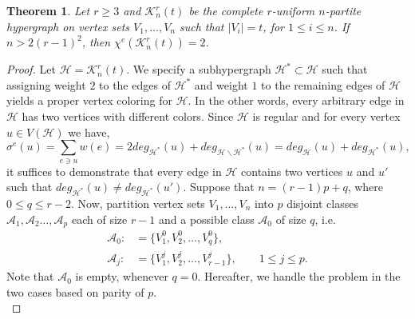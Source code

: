 \documentclass[12pt,a4paper]{article}
\newtheorem{theorem}{\bf Theorem}[section]
\begin{document}
\begin{theorem}\label{complete}
	Let $ r\geq 3 $ and $\mathcal{K}_n^r(t) $ be the complete $ r$-uniform $ n$-partite  hypergraph on vertex sets  $ V_1,\ldots, V_n $ such that  $\vert V_i\vert = t$, for  $1\leq i\leq n$. If $ n>2(r-1)^2 $, then $ \chi^{e}(\mathcal{K}_n^r(t))=2 $.
\end{theorem}

\begin{proof}	
	Let $\mathcal{H}=\mathcal{K}_n^r(t)$. We specify a subhypergraph $ \mathcal{H}^*\subset \mathcal{H} $ such that assigning weight $ 2 $ to the edges of $ \mathcal{H}^* $ and weight $ 1 $ to the remaining edges of $ \mathcal{H} $  yields a proper vertex coloring for $ \mathcal{H} $.
	In the other words, every arbitrary edge in $\mathcal{H} $ has two vertices with different colors. Since $ \mathcal{H} $ is regular and for every vertex $ u \in V(\mathcal{H}) $ we have, $$ \sigma ^{e}(u)=\sum_{e\ni u}w(e)=2deg_{\mathcal{H}^*}(u)+deg_{\mathcal{H}\backslash \mathcal{H}^*}(u)=deg_{\mathcal{H}}(u)+deg_{\mathcal{H}^*}(u), $$
	it suffices to demonstrate  that every edge in $ \mathcal{H} $ contains two vertices $ u $ and $ u' $ such that
	$ deg_{\mathcal{H}^*}(u)\neq deg_{\mathcal{H}^*}(u') $.
	Suppose that $ n=(r-1)p+q $, where $ 0\leq q\leq r-2 $. Now, partition vertex sets $ V_1,\ldots, V_n $  into  $ p $  disjoint classes $ \mathcal{A}_1, \mathcal{A}_2\ldots, \mathcal{A}_p $ each of  size $ r-1 $ and a possible class $ \mathcal{A}_0 $ of size $ q $, i.e.
	\begin{align*}
	\mathcal{A}_0:&=\{V_1^0, V_2^0, \ldots, V_q^0\},\\
	\mathcal{A}_j:&=\{V^j_1, V^j_2, \ldots, V^j_{r-1}\}, \qquad 1\leq j\leq p.
	\end{align*}
	Note that $ \mathcal{A}_0 $ is empty, whenever $ q=0 $. Hereafter, we handle the problem in the two cases based on parity of $ p $. \\
	

\end{proof}
\end{document}
